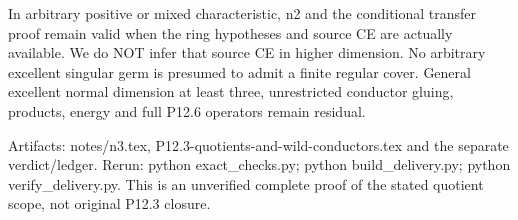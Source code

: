 In arbitrary positive or mixed characteristic, n2 and the conditional
transfer proof remain valid when the ring hypotheses and source CE are
actually available. We do NOT infer that source CE in higher dimension.
No arbitrary excellent singular germ is presumed to admit a finite regular
cover. General excellent normal dimension at least three, unrestricted
conductor gluing, products, energy and full P12.6 operators remain residual.

Artifacts: notes/n3.tex, P12.3-quotients-and-wild-conductors.tex and the
separate verdict/ledger. Rerun: python exact\_checks.py;
python build\_delivery.py; python verify\_delivery.py. This is an unverified
complete proof of the stated quotient scope, not original P12.3 closure.
